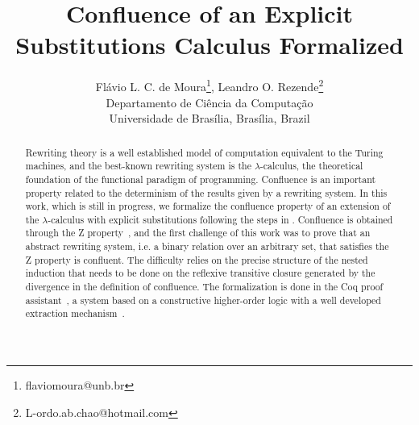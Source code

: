 \documentclass[11pt]{article}
\date{}
\begin{document}
\title{Confluence of an Explicit Substitutions Calculus Formalized}

\author{
  {\large Fl\'avio L. C. de Moura}\thanks{flaviomoura@unb.br},
    {\large Leandro O. Rezende}\thanks{L-ordo.ab.chao@hotmail.com}\\
  {\small Departamento de Ci\^encia da Computa\c{c}\~ao}\\
  {\small Universidade de Bras\'ilia, Bras\'ilia, Brazil} }

\maketitle

\begin{abstract}
  Rewriting theory is a well established model of computation
  equivalent to the Turing machines, and the best-known rewriting
  system is the $\lambda$-calculus, the theoretical foundation of the
  functional paradigm of programming. Confluence is an important
  property related to the determinism of the results given by a
  rewriting system. In this work, which is still in progress, we
  formalize the confluence property of an extension of the
  $\lambda$-calculus with explicit substitutions following the steps
  in \cite{DK08,kes09}. Confluence is obtained through the Z
  property~\cite{zproperty}, and the first challenge of this work was
  to prove that an abstract rewriting system, i.e. a binary relation
  over an arbitrary set, that satisfies the Z property is
  confluent. The difficulty relies on the precise structure of the
  nested induction that needs to be done on the reflexive transitive
  closure generated by the divergence in the definition of
  confluence. The formalization is done in the Coq proof
  assistant~\cite{CoqTeam}, a system based on a constructive
  higher-order logic with a well developed extraction
  mechanism~\cite{Let2008}.


\end{abstract}
\end{document}
